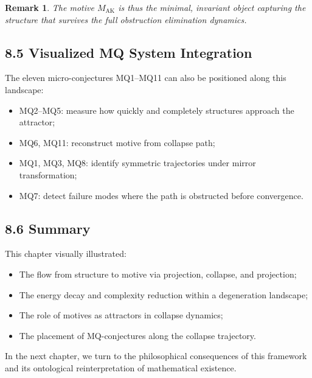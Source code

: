 \documentclass[11pt]{article}
\newtheorem{remark}[theorem]{Remark}
\begin{document}
\begin{remark}
The motive $M_{\mathrm{AK}}$ is thus the minimal, invariant object capturing the structure that survives the full obstruction elimination dynamics.
\end{remark}

\subsection{8.5 Visualized MQ System Integration}

The eleven micro-conjectures MQ1–MQ11 can also be positioned along this landscape:

\begin{itemize}
    \item MQ2–MQ5: measure how quickly and completely structures approach the attractor;
    \item MQ6, MQ11: reconstruct motive from collapse path;
    \item MQ1, MQ3, MQ8: identify symmetric trajectories under mirror transformation;
    \item MQ7: detect failure modes where the path is obstructed before convergence.
\end{itemize}

\subsection{8.6 Summary}

This chapter visually illustrated:

\begin{itemize}
    \item The flow from structure to motive via projection, collapse, and projection;
    \item The energy decay and complexity reduction within a degeneration landscape;
    \item The role of motives as attractors in collapse dynamics;
    \item The placement of MQ-conjectures along the collapse trajectory.
\end{itemize}

In the next chapter, we turn to the philosophical consequences of this framework and its ontological reinterpretation of mathematical existence.

\FloatBarrier



\end{document}

